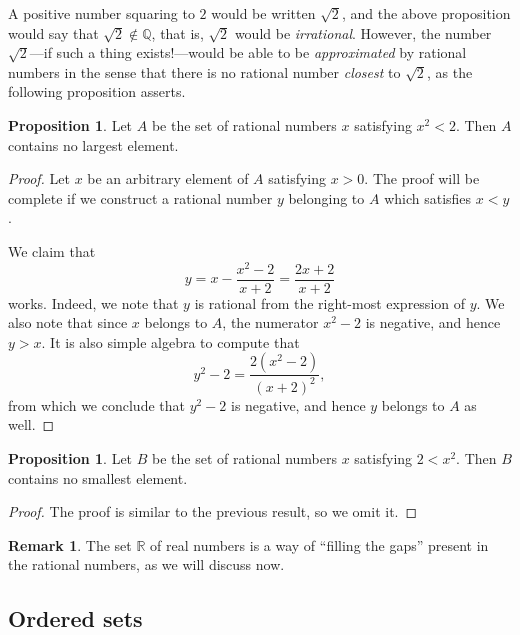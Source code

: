 \documentclass[12pt]{article}
\theoremstyle{definition}
\newtheorem{remark}[definition]{Remark}
\theoremstyle{theorem}
\newtheorem{proposition}[definition]{Proposition}
\begin{document}
A positive number squaring to $2$ would be written $\sqrt{2}$, and the above proposition would say that $\sqrt{2} \notin \mathbb{Q}$, that is, $\sqrt{2}$ would be \emph{irrational}. However, the number $\sqrt{2}$---if such a thing exists!---would be able to be \emph{approximated} by rational numbers in the sense that there is no rational number \emph{closest} to $\sqrt{2}$, as the following proposition asserts. 

\begin{proposition}
Let $A$ be the set of rational numbers $x$ satisfying $x^2 < 2$. Then $A$ contains no largest element. 
\end{proposition} 

\begin{proof}
Let $x$ be an arbitrary element of $A$ satisfying $x > 0$. The proof will be complete if we construct a rational number $y$ belonging to $A$ which satisfies $x < y$. 

We claim that 
\[
y = x - \frac{x^2 - 2}{x+2} = \frac{2x +2}{x+2}
\]
works. Indeed, we note that $y$ is rational from the right-most expression of $y$. We also note that since $x$ belongs to $A$, the numerator $x^2 - 2$ is negative, and hence $y > x$. It is also simple algebra to compute that 
\[
y^2 - 2 = \frac{2(x^2 - 2)}{(x+2)^2},
\]
from which we conclude that $y^2 - 2$ is negative, and hence $y$ belongs to $A$ as well. 
\end{proof}

\begin{proposition}
Let $B$ be the set of rational numbers $x$ satisfying $2 < x^2$. Then $B$ contains no smallest element. 
\end{proposition}

\begin{proof}
The proof is similar to the previous result, so we omit it. 
\end{proof}

\begin{remark}
The set $\mathbb{R}$ of real numbers is a way of ``filling the gaps'' present in the rational numbers, as we will discuss now. 
\end{remark}

\subsection{Ordered sets}
\end{document}
